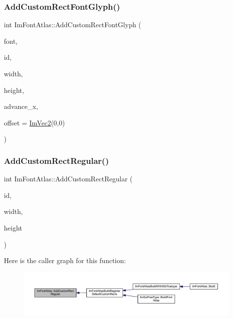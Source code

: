 \subsubsection{\texorpdfstring{Add\+Custom\+Rect\+Font\+Glyph()}{AddCustomRectFontGlyph()}}
{\footnotesize\ttfamily int Im\+Font\+Atlas\+::\+Add\+Custom\+Rect\+Font\+Glyph (\begin{DoxyParamCaption}\item[{\mbox{\hyperlink{struct_im_font}{Im\+Font}} $\ast$}]{font,  }\item[{\mbox{\hyperlink{imgui_8h_af2c7badaf05a0008e15ef76d40875e97}{Im\+Wchar}}}]{id,  }\item[{int}]{width,  }\item[{int}]{height,  }\item[{float}]{advance\+\_\+x,  }\item[{const \mbox{\hyperlink{struct_im_vec2}{Im\+Vec2}} \&}]{offset = {\ttfamily \mbox{\hyperlink{struct_im_vec2}{Im\+Vec2}}(0,0)} }\end{DoxyParamCaption})}

\mbox{\label{struct_im_font_atlas_ac51952803d2205f28ca9fc996c5f6243}} 
\subsubsection{\texorpdfstring{Add\+Custom\+Rect\+Regular()}{AddCustomRectRegular()}}
{\footnotesize\ttfamily int Im\+Font\+Atlas\+::\+Add\+Custom\+Rect\+Regular (\begin{DoxyParamCaption}\item[{unsigned int}]{id,  }\item[{int}]{width,  }\item[{int}]{height }\end{DoxyParamCaption})}

Here is the caller graph for this function\+:
\nopagebreak
\begin{figure}[H]
\begin{center}
\leavevmode
\includegraphics[width=350pt]{struct_im_font_atlas_ac51952803d2205f28ca9fc996c5f6243_icgraph}
\end{center}
\end{figure}
\mbox{\label{struct_im_font_atlas_ad01c0f19a95d37a9e5ebab1e54525625}} 
